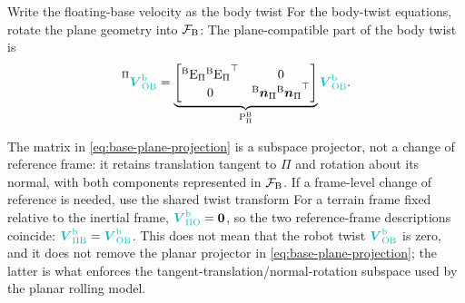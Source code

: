 \documentclass[10pt]{article}
\begin{document}
Write the floating-base velocity as the body twist
For the body-twist equations, rotate the plane geometry into $\cframe[fb]$:
The plane-compatible part of the body twist is
\begin{equation}
  \label{eq:base-plane-projection}
  \prescript{\Pi}{}{\bodyVel{\inertialFrame}{\fbFrame}}
  =
  \underbrace{
    \begin{bmatrix}
      {}^{\fbFrame}\text{E}_{\Pi}
        \transpose{{}^{\fbFrame}\text{E}_{\Pi}} & \zeroMatrix\\
      \zeroMatrix &
        {}^{\fbFrame}\surfaceNormal_{\Pi}
        \transpose{{}^{\fbFrame}\surfaceNormal_{\Pi}}
    \end{bmatrix}
  }_{\text{P}^{\fbFrame}_{\Pi}}
  \bodyVel{\inertialFrame}{\fbFrame}.
\end{equation}


The matrix in \eqref{eq:base-plane-projection} is a subspace projector, not
a change of reference frame: it retains translation tangent to $\Pi$ and
rotation about its normal, with both components represented in $\cframe[fb]$.
If a frame-level change of reference is needed, use the shared twist transform
For a terrain frame fixed relative to the inertial frame,
$\bodyVel{\Pi}{\inertialFrame}=\zeroVector$, so the two reference-frame
descriptions coincide:
$\bodyVel{\Pi}{\fbFrame}=\bodyVel{\inertialFrame}{\fbFrame}$.
This does not mean that the robot twist
$\bodyVel{\inertialFrame}{\fbFrame}$ is zero, and it does not remove the
planar projector in \eqref{eq:base-plane-projection}; the latter is what
enforces the tangent-translation/normal-rotation subspace used by the planar
rolling model.
\end{document}
